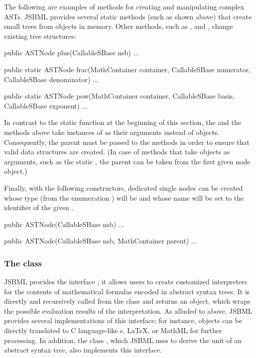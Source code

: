 The following are examples of methods for creating and manipulating complex
ASTs.  JSBML provides several static methods (such as  shown above)
that create small trees from objects in memory.  Other methods, such as
,  and , change existing tree structures:

\begin{example}[style=java, title={Some examples for convenience methods, some of
    them static methods, provided by JSBML for working with \ASTNode{}s.}]
public ASTNode plus(CallableSBase nsb) { ... }

public static ASTNode frac(MathContainer container,
      CallableSBase numerator, CallableSBase denominator) { ... }

public static ASTNode pow(MathContainer container,
      CallableSBase basis, CallableSBase exponent) { ... }
\end{example}

In contrast to the static  function at the beginning of
this section, the  and the  methods above take instances
of \CallableSBase as their arguments instead of \ASTNode objects. Consequently, the
parent \MathContainer must be passed to the methods in order to ensure that
valid data structures are created. (In case of methods that take \ASTNode
objects as arguments, such as the static , the parent
\MathContainer can be taken from the first given node object.)

Finally, with the following \ASTNode constructors, dedicated single nodes can
be created whose type (from the enumeration \ASTType) will be  and
whose name will be set to the identifier of the given \CallableSBase.

\begin{example}
public ASTNode(CallableSBase nsb) { ... }

public ASTNode(CallableSBase nsb, MathContainer parent) { ... }
\end{example}


\subsubsection{The  class}

JSBML provides the interface \ASTNodeCompiler; it allows users to create
customized interpreters for the contents of mathematical formulas encoded
in abstract syntax trees. It is directly and recursively called from the
\ASTNode class and returns an \ASTNodeValue object, which wraps the
possible evaluation results of the interpretation.  As alluded to above,
JSBML provides several implementations of this interface; for instance,
\ASTNode objects can be directly translated to C language-like \String{}s,
\LaTeX,  or MathML  for further
processing.  In addition, the class \UnitsCompiler, which JSBML uses to
derive the unit of an abstract syntax tree, also implements this interface.


